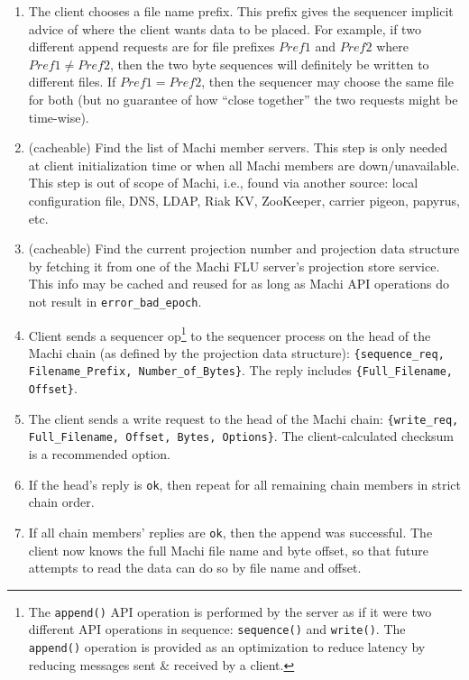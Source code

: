 \documentclass[preprint,10pt]{sigplanconf}
\begin{document}
\begin{enumerate}

\item The client chooses a file name prefix.  This prefix gives the
sequencer implicit advice of where the client wants data to be
placed.  For example, if two different append requests are for file
prefixes $Pref1$ and $Pref2$ where $Pref1 \ne Pref2$, then the two byte
sequences will definitely be written to different files.  If
$Pref1 = Pref2$,
then the sequencer may choose the same file for both (but no
guarantee of how ``close together'' the two requests might be time-wise).

\item (cacheable) Find the list of Machi member servers.  This step is
only needed at client initialization time or when all Machi members
are down/unavailable.  This step is out of scope of Machi, i.e., found
via another source: local configuration file, DNS, LDAP, Riak KV, ZooKeeper,
carrier pigeon, papyrus, etc.

\item (cacheable) Find the current projection number and projection data
structure by fetching it from one of the Machi FLU server's
projection store service.  This info
may be cached and reused for as long as Machi API operations do not
result in {\tt error\_bad\_epoch}.

\item Client sends a sequencer op\footnote{The {\tt append()} API
  operation is performed by the server as if it were two different API
operations in sequence: {\tt sequence()} and {\tt write()}.  The {\tt
  append()} operation is provided as an optimization to reduce latency
by reducing messages sent \& received by a client.}
to the sequencer process on the head of
the Machi chain (as defined by the projection data structure):
{\tt \{sequence\_req, Filename\_Prefix, Number\_of\_Bytes\}}.  The reply
includes {\tt \{Full\_Filename, Offset\}}.

\item The client sends a write request to the head of the Machi chain:
{\tt \{write\_req, Full\_Filename, Offset, Bytes, Options\}}.  The
client-calculated checksum is a recommended option.

\item If the head's reply is {\tt ok}, then repeat for all remaining chain
members in strict chain order.

\item If all chain members' replies are {\tt ok}, then the append was
successful.  The client now knows the full Machi file name and byte
offset, so that future attempts to read the data can do so by file
name and offset.


\end{enumerate}
\end{document}

